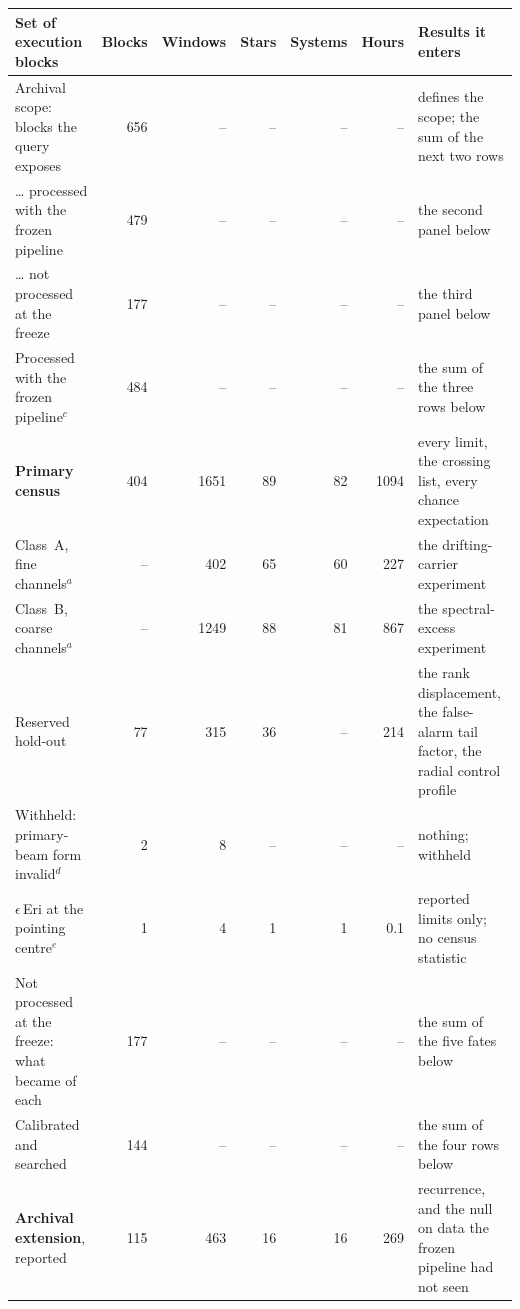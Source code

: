 \begin{tabular}{@{}p{}rrrrrp{}@{}}
\hline
Set of execution blocks & Blocks & Windows & Stars & Systems & Hours & Results it enters \\
\hline
Archival scope: blocks the query exposes & 656 & -- & -- & -- & -- & defines the scope; the sum of the next two rows \\
\hspace{1.1em}\ldots{} processed with the frozen pipeline & 479 & -- & -- & -- & -- & the second panel below \\
\hspace{1.1em}\ldots{} not processed at the freeze & 177 & -- & -- & -- & -- & the third panel below \\
\hline
Processed with the frozen pipeline$^{c}$ & 484 & -- & -- & -- & -- & the sum of the three rows below \\
\hspace{1.1em}\textbf{Primary census} & 404 & 1651 & 89 & 82 & 1094 & every limit, the crossing list, every chance expectation \\
\hspace{2.2em}Class~A, fine channels$^{a}$ & -- & 402 & 65 & 60 & 227 & the drifting-carrier experiment \\
\hspace{2.2em}Class~B, coarse channels$^{a}$ & -- & 1249 & 88 & 81 & 867 & the spectral-excess experiment \\
\hspace{1.1em}Reserved hold-out & 77 & 315 & 36 & -- & 214 & the rank displacement, the false-alarm tail factor, the radial control profile \\
\hspace{1.1em}Withheld: primary-beam form invalid$^{d}$ & 2 & 8 & -- & -- & -- & nothing; withheld \\
\hspace{1.1em}$\epsilon$\,Eri at the pointing centre$^{e}$ & 1 & 4 & 1 & 1 & 0.1 & reported limits only; no census statistic \\
\hline
Not processed at the freeze: what became of each & 177 & -- & -- & -- & -- & the sum of the five fates below \\
\hspace{1.1em}Calibrated and searched & 144 & -- & -- & -- & -- & the sum of the four rows below \\
\hspace{2.2em}\textbf{Archival extension}, reported & 115 & 463 & 16 & 16 & 269 & recurrence, and the null on data the frozen pipeline had not seen \\

\end{tabular}
